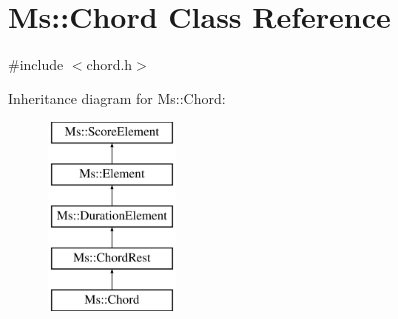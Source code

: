 \hypertarget{class_ms_1_1_chord}{}\section{Ms\+:\+:Chord Class Reference}
\label{class_ms_1_1_chord}


{\ttfamily \#include $<$chord.\+h$>$}

Inheritance diagram for Ms\+:\+:Chord\+:\begin{figure}[H]
\begin{center}
\leavevmode
\includegraphics[height=5.000000cm]{class_ms_1_1_chord}
\end{center}
\end{figure}
